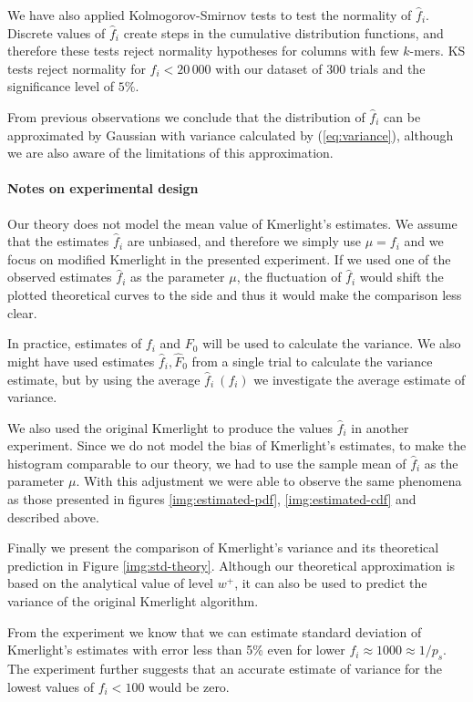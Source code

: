 \medskip

We have also applied Kolmogorov-Smirnov tests to test the normality of $\hat f_i$. Discrete
values of $\hat f_i$ create steps in the cumulative distribution functions, and therefore these
tests reject normality hypotheses for columns with few $k$-mers. KS tests reject normality
for $f_i < 20\,000$ with our dataset of 300 trials and the significance level of $5\%$. 

From previous observations we conclude that the distribution of $\hat f_i$ can be approximated
by Gaussian with variance calculated by (\ref{eq:variance}), although we are also aware of the
limitations of this approximation.

\paragraph{Notes on experimental design}
Our theory does not model the mean value of Kmerlight's estimates. We assume that the estimates
$\hat f_i$ are unbiased, and therefore we simply use $\mu = f_i$ and we focus on modified
Kmerlight in the presented experiment. If we used one of the observed estimates $\hat f_i$
as the parameter $\mu$, the fluctuation of $\hat f_i$ would shift the plotted theoretical 
curves to the side and thus it would make the comparison less clear. 

In practice, estimates of $f_i$ and $F_0$ will be used to calculate the variance. We also might
have used estimates $\hat f_i, \hat F_0$ from a single trial to calculate the variance estimate, 
but by using the average $\hat f_i~(f_i)$ we investigate the average estimate of variance.   

We also used the original Kmerlight to produce the values $\hat f_i$ in another experiment.
Since we do not model the bias of Kmerlight's estimates, to make the histogram comparable
to our theory, we had to use the sample mean of $\hat f_i$ as the parameter $\mu$.
With this adjustment we were able to observe the same phenomena as those presented in figures
\ref{img:estimated-pdf}, \ref{img:estimated-cdf} and described above.

\medskip

Finally we present the comparison of Kmerlight's variance and its theoretical prediction in
Figure \ref{img:std-theory}. Although our theoretical approximation is based on the 
analytical value of level $w^+$, it can also be used to predict the variance of the original 
Kmerlight algorithm. 

From the experiment we know that we can estimate standard deviation of Kmerlight's estimates
with error less than 5\% even for lower $f_i \approx 1000 \approx 1/p_s.$
The experiment further suggests that an accurate estimate of
variance for the lowest values of $f_i < 100$ would be zero. 

